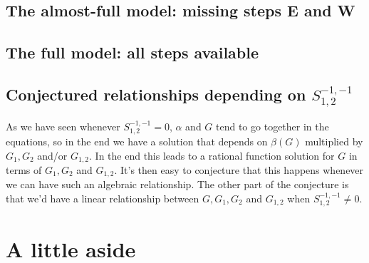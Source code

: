 \documentclass[12pt]{article}
\theoremstyle{definition} \newtheorem{definition}[theorem]{Definition}
\newcommand{\Sf}[1]{S_{1,2}^{#1}}
\begin{document}
\subsection{The almost-full model: missing steps E and W}

\subsection{The full model: all steps available}

\subsection{Conjectured relationships depending on $\Sf{-1,-1}$}
As we have seen whenever $\Sf{-1,-1} = 0$, $\alpha$ and $G$ tend to go together in the equations, so in the end we have a solution that depends on $\beta(G)$ multiplied by $G_1,G_2$ and/or $G_{1,2}$. In the end this leads to a rational function solution for $G$ in terms of $G_1, G_2$ and $G_{1,2}$. It's then easy to conjecture that this happens whenever we can have such an algebraic relationship. The other part of the conjecture is that we'd have a linear relationship between $G, G_1,G_2$ and $G_{1,2}$ when $\Sf{-1,-1} \neq 0$.

\section{A little aside}
\end{document}
